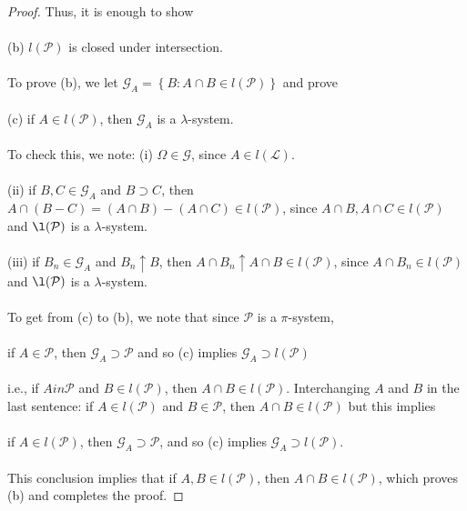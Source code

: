 \documentclass[10pt]{article}
\newtheorem{proof}{Proof}
\begin{document}
\begin{proof}
	\noindent Thus, it is enough to show\\
	\\
	(b) $l(\mathcal{P})$ is closed under intersection.\\
	\\
	To prove (b), we let $\mathcal{G}_A = \left\{B:A\cap B \in l(\mathcal{P})\right\}$ and prove\\
	\\
	(c) if $A \in l(\mathcal{P})$, then $\mathcal{G}_A$ is a $\lambda$-system.\\
	\\
	To check this, we note: (i) $\Omega \in \mathcal{G}$, since $A \in l(\mathcal{L})$.\\
	\\
	(ii) if $B, C \in \mathcal{G}_A$ and $B \supset C$, then $A \cap (B-C) = (A\cap B)-(A\cap C) \in l(\mathcal{P})$, since $A\cap B, A\cap C \in l(\mathcal{P})$  and $\l(\mathcal{P})$ is a $\lambda$-system.\\
	\\
	(iii) if $B_n \in \mathcal{G}_A$ and $B_n \uparrow B$, then $A \cap B_n \uparrow A \cap B \in l(\mathcal{P})$, since $A\cap B_n \in l(\mathcal{P})$ and $\l(\mathcal{P})$ is a $\lambda$-system.\\
	\\
	To get from (c) to (b), we note that since $\mathcal{P}$ is a $\pi$-system,\\
	\\
	if $A \in \mathcal{P}$, then $\mathcal{G}_A \supset \mathcal{P}$ and so (c) implies $\mathcal{G}_A \supset l(\mathcal{P})$\\
	\\
	i.e., if $A in \mathcal{P}$ and $B \in l(\mathcal{P})$, then $A\cap B \in l(\mathcal{P})$. Interchanging $A$ and $B$ in the last sentence: if $A \in l(\mathcal{P})$ and $B \in \mathcal{P}$, then $A\cap B \in l(\mathcal{P})$ but this implies\\
	\\
	if $A \in l(\mathcal{P})$, then $\mathcal{G}_A \supset \mathcal{P}$, and so (c) implies $\mathcal{G}_A \supset l(\mathcal{P})$.\\
	\\
	This conclusion implies that if $A, B \in l(\mathcal{P})$, then $A\cap B \in l(\mathcal{P})$, which proves (b) and completes the proof.
\end{proof}
\end{document}
